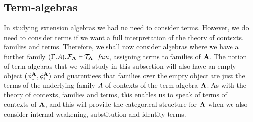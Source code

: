 \begin{comment}
\begin{rmk}
Before we continue, let us explore what it means to be an extension algebra
term of the extension algebra $\ctxwk{\mathcal{A}}{\mathcal{B}}$. Such an
extension algebra term $(x,y)$ would consist of
\begin{align*}
\jterm*{{\Gamma}{A}}{\ctxwk{A}{B}}{x}\\
\jterm*{{{\Gamma}{A}}{P}}{\subst{\jcomp{}{\epsilon_0}{x}}{\ctxwk{\ctxext{A}{P}}{Q}}}{y}.
\end{align*}
Thus, $x$ is a context morphism from $A$ to $B$ and $y$ is nothing but a term
of $\jcomp{}{\jcomp{}{\epsilon_0}{x}}{Q}$. For $x$, we see that the diagram
\begin{equation*}
\begin{tikzcd}
\ctxext{B}{Q} 
  \ar{r}{g} 
& B 
  \\
\ctxext{A}{P} 
  \ar{u}{\jvcomp{}{x}{y}}
  \ar{r}{e}
& A
  \ar{u}[swap]{x}
\end{tikzcd}
\end{equation*}
commutes.
\end{rmk}
\end{comment}

\subsection{Term-algebras}
In studying extension algebras we had no need to consider terms. However, we
do need to consider terms if we want a full interpretation of the theory of
contexts, families and terms. Therefore, we shall now consider algebras where
we have a further family 
$\jfam{{{\Gamma}{A}}{\cftalgf{\cftalg{A}}}}{\cftalgt{\cftalg{A}}}$, assigning
terms to families of $\mathbf{A}$. The notion of term-algebras that we will
study in this subsection will also have an empty object $(\phi_{\mathsf{c}}^{\mathbf{A}},
\phi_{\mathsf{f}}^{\mathbf{A}})$ and guarantiees that families over the empty object
are just the terms of the underlying family $\cftalgc{\cftalg{A}}$ of contexts
of the term-algebra $\mathbf{A}$. As with the theory of contexts, families and
terms, this enables us to speak of terms of contexts of $\mathbf{A}$, and this
will provide the categorical structure for $\mathbf{A}$ when we also consider
internal weakening, substitution and identity terms.

